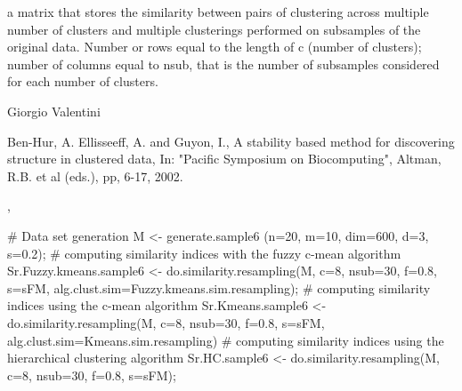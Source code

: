\documentclass{article}
\begin{document}
\begin{Value}
a matrix that stores the similarity between pairs of clustering across multiple number of clusters
and multiple clusterings performed on subsamples of the original data.
Number or rows equal to the length of c (number of clusters); number of columns      
equal to nsub, that is the number of subsamples considered for each number of clusters.
\end{Value}
\begin{Author}\relax
Giorgio Valentini 
\end{Author}
\begin{References}\relax
Ben-Hur, A. Ellisseeff, A. and Guyon, I., A stability based method for discovering structure in clustered data,
In: "Pacific Symposium on Biocomputing", Altman, R.B. et al (eds.), pp, 6-17, 2002.
\end{References}
\begin{SeeAlso}\relax
{}, 
\end{SeeAlso}
\begin{Examples}
\begin{ExampleCode}
# Data set generation
M <- generate.sample6 (n=20, m=10, dim=600, d=3, s=0.2);
# computing similarity indices with the fuzzy c-mean algorithm
Sr.Fuzzy.kmeans.sample6 <- do.similarity.resampling(M, c=8, nsub=30, f=0.8, s=sFM, 
                           alg.clust.sim=Fuzzy.kmeans.sim.resampling);
# computing similarity indices using the c-mean algorithm
Sr.Kmeans.sample6 <- do.similarity.resampling(M, c=8, nsub=30, f=0.8, s=sFM, 
                                      alg.clust.sim=Kmeans.sim.resampling)
# computing similarity indices using the hierarchical clustering algorithm
Sr.HC.sample6 <- do.similarity.resampling(M, c=8, nsub=30, f=0.8, s=sFM);
\end{ExampleCode}
\end{Examples}
\end{document}
